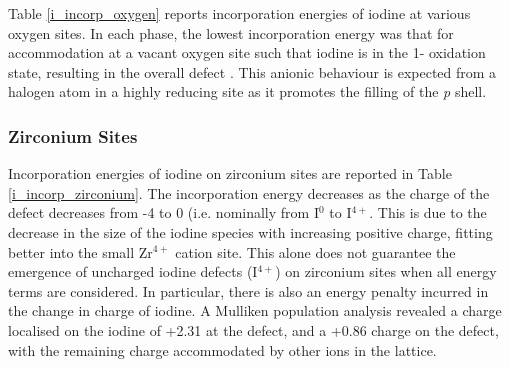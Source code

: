 Table \ref{i_incorp_oxygen} reports incorporation energies of iodine at various oxygen sites. In each phase, the lowest incorporation energy was that for accommodation at a vacant oxygen site such that iodine is in the 1- oxidation state, resulting in the overall defect . This anionic behaviour is expected from a halogen atom in a highly reducing site as it promotes the filling of the \emph{p} shell. %

\subsubsection*{Zirconium Sites}

Incorporation energies of iodine on zirconium sites are reported in Table \ref{i_incorp_zirconium}. The  incorporation energy decreases as the charge of the defect decreases from -4 to 0 (i.e. nominally from I$^{0}$ to I$^{4+}$. This is due to the decrease in the size of the iodine species with increasing positive charge, fitting better into the small Zr$^{4+}$ cation site. This alone does not guarantee the emergence of uncharged iodine defects (I$^{4+}$) on zirconium sites when all energy terms are considered. In particular, there is also an energy penalty incurred in the change in charge of iodine. A Mulliken population analysis revealed a charge localised on the iodine of +2.31 at the  defect, and a +0.86 charge on the  defect, with the remaining charge accommodated by other ions in the lattice. 

